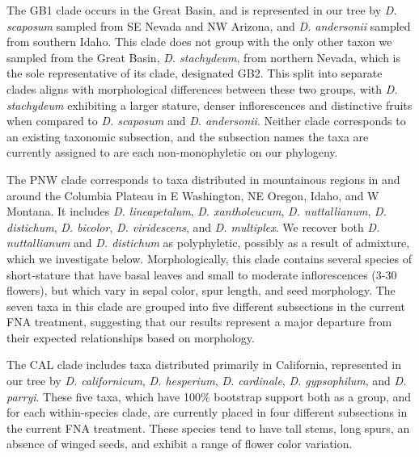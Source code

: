 \documentclass[11pt]{article}
\begin{document}
The GB1 clade occurs in the Great Basin, and is represented in our tree
by \emph{D. scaposum} sampled from SE Nevada and NW Arizona, and 
\emph{D. andersonii} sampled from southern Idaho.
This clade does not group with the only other taxon we sampled from the Great
Basin, \emph{D. stachydeum}, from northern Nevada, which is the sole representative of its clade, designated GB2. 
% 
This split into separate clades aligns with morphological differences between these
two groups, with \textit{D. stachydeum} exhibiting a larger stature, denser 
inflorescences and distinctive fruits when compared to \textit{D. scaposum} and 
\textit{D. andersonii}. 
% 
Neither clade corresponds to an existing taxonomic subsection, and the 
subsection names the taxa are currently assigned to are each non-monophyletic on 
our phylogeny.

% 
The PNW clade corresponds to taxa distributed in mountainous regions in and around the Columbia
Plateau in E Washington, NE Oregon, Idaho, and W Montana. It includes \emph{D. lineapetalum}, 
\emph{D. xantholeucum}, \emph{D. nuttallianum}, \emph{D. distichum}, \emph{D. bicolor}, 
\emph{D. viridescens}, and \emph{D. multiplex}. We recover both \emph{D. nuttallianum}
and \emph{D. distichum} as polyphyletic, possibly as a result of admixture, which we
investigate below. 
Morphologically, this clade contains several species of short‑stature that have basal
leaves and small to moderate inflorescences (3-30 flowers), but which vary in sepal
color, spur length, and seed morphology.
% 
The seven taxa in this clade are grouped into five different subsections in the 
current FNA treatment, suggesting that our results represent a major departure from
their expected relationships based on morphology.

% 
The CAL clade includes taxa distributed primarily in California, represented in our
tree by \emph{D. californicum}, \emph{D. hesperium}, \emph{D. cardinale}, 
\emph{D. gypsophilum}, and \emph{D. parryi}. 
These five taxa, which have 100\% bootstrap support both as a group, and for each within-species clade, are currently placed in four different 
subsections in the current FNA treatment. These species tend to have tall stems, 
long spurs, an absence of winged seeds, and exhibit a range of flower color
variation.
\end{document}
